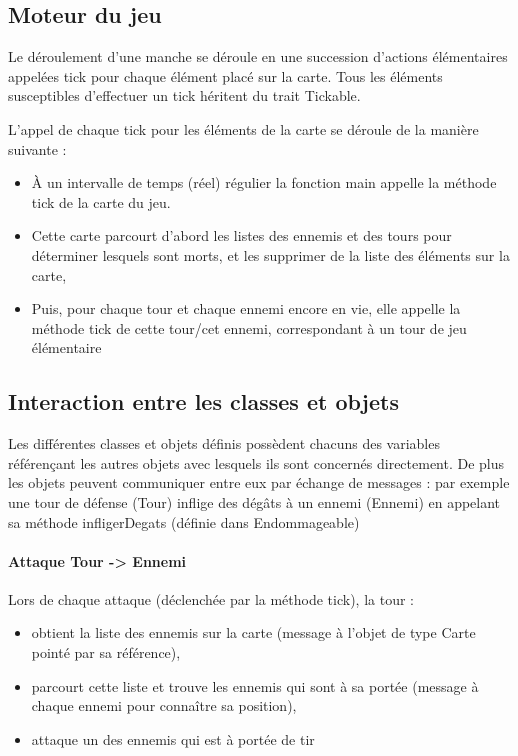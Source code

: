 \documentclass{article}
\begin{document}
\subsection{Moteur du jeu}

Le déroulement d'une manche se déroule en une succession d'actions élémentaires appelées tick pour chaque élément placé sur la carte. Tous les éléments susceptibles d'effectuer un tick héritent du trait Tickable.

L'appel de chaque tick pour les éléments de la carte se déroule de la manière suivante :

\begin{itemize}
  \item À un intervalle de temps (réel) régulier la fonction main appelle la méthode tick de la carte du jeu.
  \item Cette carte parcourt d'abord les listes des ennemis et des tours pour déterminer lesquels sont morts, et les supprimer de la liste des éléments sur la carte,
  \item Puis, pour chaque tour et chaque ennemi encore en vie, elle appelle la méthode tick de cette tour/cet ennemi, correspondant à un tour de jeu élémentaire
\end{itemize}


\subsection{Interaction entre les classes et objets}

Les différentes classes et objets définis possèdent chacuns des variables référençant les autres objets avec lesquels ils sont concernés directement. De plus les objets peuvent communiquer entre eux par échange de messages : par exemple une tour de défense (Tour) inflige des dégâts à un ennemi (Ennemi) en appelant sa méthode infligerDegats (définie dans Endommageable)

\paragraph{Attaque Tour -> Ennemi}

Lors de chaque attaque (déclenchée par la méthode tick), la tour :

\begin{itemize}
  \item obtient la liste des ennemis sur la carte (message à l'objet de type Carte pointé par sa référence),
  \item parcourt cette liste et trouve les ennemis qui sont à sa portée (message à chaque ennemi pour connaître sa position),
  \item attaque un des ennemis qui est à portée de tir
\end{itemize}
\end{document}
